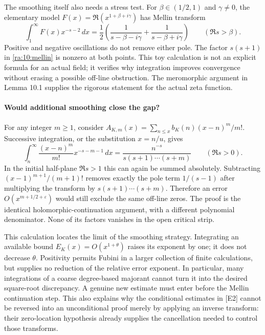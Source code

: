 \documentclass[11pt]{article}
\begin{document}
The smoothing itself also needs a stress test. For $\beta\in(1/2,1)$
and $\gamma\ne0$, the elementary model
$F(x)=\Re(x^{1+\beta+i\gamma})$ has Mellin transform
\[
 \int_1^\infty F(x)x^{-s-2}\,dx
   =\frac12\left(\frac1{s-\beta-i\gamma}
                        +\frac1{s-\beta+i\gamma}\right)
       \qquad(\Re s>\beta).
\]
Positive and negative oscillations do not remove either pole. The factor
$s(s+1)$ in \eqref{ra:10:mellin} is nonzero at both points. This toy
calculation is not an explicit formula for an actual field; it verifies
why integration improves convergence without erasing a possible off-line
obstruction. The meromorphic argument in Lemma 10.1 supplies the rigorous
statement for the actual zeta function.

\paragraph{Would additional smoothing close the gap?}
For any integer $m\ge1$, consider
$A_{K,m}(x)=\sum_{n\le x}b_K(n)(x-n)^m/m!$.
Successive integration, or the substitution $x=n/u$, gives
\[
 \int_n^\infty\frac{(x-n)^m}{m!}x^{-s-m-1}\,dx
        =\frac{n^{-s}}{s(s+1)\cdots(s+m)}\qquad(\Re s>0).
\]
In the initial half-plane $\Re s>1$ this can again be summed absolutely.
Subtracting $(x-1)^{m+1}/(m+1)!$ removes exactly the pole term
$1/(s-1)$ after multiplying the transform by
$s(s+1)\cdots(s+m)$. Therefore an error
$O(x^{m+1/2+\varepsilon})$ would still exclude the same off-line zeros.
The proof is the identical holomorphic-continuation argument, with a
different polynomial denominator. None of its factors vanishes in the
open critical strip.

This calculation locates the limit of the smoothing strategy. Integrating
an available bound $E_K(x)=O(x^{1+\theta})$ raises its exponent by one;
it does not decrease $\theta$. Positivity permits Fubini in a larger
collection of finite calculations, but supplies no reduction of the
relative error exponent. In particular, many integrations of a coarse
degree-based majorant cannot turn it into the desired square-root
discrepancy. A genuine new estimate must enter before the Mellin
continuation step. This also explains why the conditional estimates in
[E2] cannot be reversed into an unconditional proof merely by applying
an inverse transform: their zero-location hypothesis already supplies
the cancellation needed to control those transforms.
\end{document}
